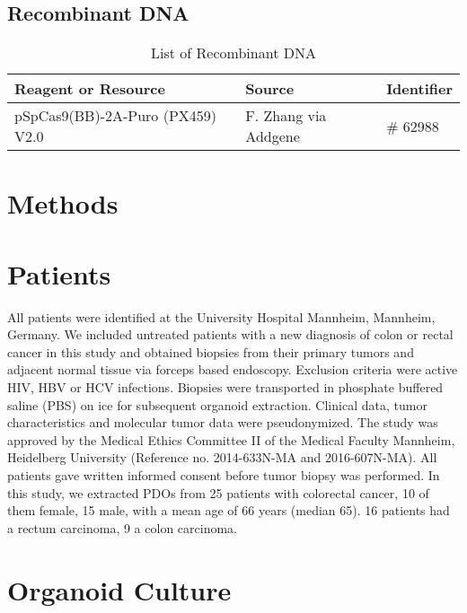 \begin{flushleft}
\subsection*{Recombinant DNA}
\begin{table}[htb]
\caption{List of Recombinant DNA}
\label{tab:recombinant_dna} %
\begin{tabularx}{\textwidth}{Xll}
\toprule
\textbf{Reagent or Resource} & \textbf{Source} & \textbf{Identifier} \\
\midrule
pSpCas9(BB)-2A-Puro (PX459) V2.0 & F. Zhang via Addgene & \# 62988 \\
\bottomrule
\end{tabularx}
\end{table}

\section{Methods}

\section{Patients}
All patients were identified at the University Hospital Mannheim, Mannheim, Germany. We included untreated patients with a new diagnosis of colon or rectal cancer in this study and obtained biopsies from their primary tumors and adjacent normal tissue via forceps based endoscopy. Exclusion criteria were active HIV, HBV or HCV infections. Biopsies were transported in phosphate buffered saline (PBS) on ice for subsequent organoid extraction. Clinical data, tumor characteristics and molecular tumor data were pseudonymized. The study was approved by the Medical Ethics Committee II of the Medical Faculty Mannheim, Heidelberg University (Reference no. 2014-633N-MA and 2016-607N-MA). All patients gave written informed consent before tumor biopsy was performed. In this study, we extracted PDOs from 25 patients with colorectal cancer, 10 of them female, 15 male, with a mean age of 66 years (median 65). 16 patients had a rectum carcinoma, 9 a colon carcinoma.

\section{Organoid Culture}


\end{flushleft}
